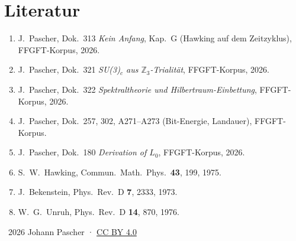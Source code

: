\section*{Literatur}

\begin{enumerate}
  \item J.\ Pascher, Dok.\ 313 \textit{Kein Anfang}, Kap.\ G (Hawking auf dem Zeitzyklus), FFGFT-Korpus, 2026.
  \item J.\ Pascher, Dok.\ 321 \textit{SU(3)$_c$ aus $\mathbb{Z}_3$-Trialität}, FFGFT-Korpus, 2026.
  \item J.\ Pascher, Dok.\ 322 \textit{Spektraltheorie und Hilbertraum-Einbettung}, FFGFT-Korpus, 2026.
  \item J.\ Pascher, Dok.\ 257, 302, A271–A273 (Bit-Energie, Landauer), FFGFT-Korpus.
  \item J.\ Pascher, Dok.\ 180 \textit{Derivation of $L_0$}, FFGFT-Korpus, 2026.
  \item S.\ W.\ Hawking, Commun.\ Math.\ Phys.\ \textbf{43}, 199, 1975.
  \item J.\ Bekenstein, Phys.\ Rev.\ D \textbf{7}, 2333, 1973.
  \item W.\ G.\ Unruh, Phys.\ Rev.\ D \textbf{14}, 870, 1976.
\end{enumerate}

\vspace{6pt}\noindent\small
\textcopyright\ 2026 Johann Pascher · \href{https://creativecommons.org/licenses/by/4.0/}{CC BY 4.0}
